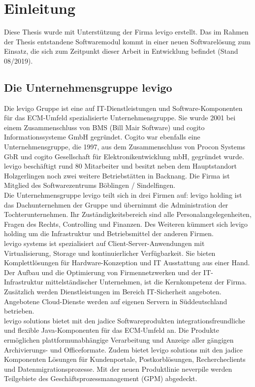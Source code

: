 \chapter{Einleitung}

Diese Thesis wurde mit Unterstützung der Firma levigo erstellt. Das im Rahmen der Thesis entstandene Softwaremodul kommt in einer neuen Softwarelösung zum Einsatz, die sich zum Zeitpunkt dieser Arbeit in Entwicklung befindet (Stand 08/2019).

\section{Die Unternehmensgruppe levigo}
Die levigo Gruppe ist eine auf \acs{IT}-Dienstleistungen und Software-Komponenten für das \acs{ECM}-Umfeld spezialisierte Unternehmensgruppe. Sie wurde 2001 bei einem Zusammenschluss von BMS (Bill Mair Software) und cogito Informationssysteme GmbH gegründet. Cogito war ebenfalls eine Unternehmensgruppe, die 1997, aus dem Zusammenschluss von Procon Systems GbR und cogito Gesellschaft für Elektronikentwicklung mbH, gegründet wurde.\\
levigo beschäftigt rund 80 Mitarbeiter und besitzt neben dem Hauptstandort Holzgerlingen noch zwei weitere Betriebstätten in Backnang. Die Firma ist Mitglied des Softwarezentrums Böblingen / Sindelfingen.\\
Die Unternehmensgruppe levigo teilt sich in drei Firmen auf: levigo holding ist das Dachunternehmen der Gruppe und übernimmt die Administration der Tochterunternehmen. Ihr Zuständigkeitsbereich sind alle Personalangelegenheiten, Fragen des Rechts, Controlling und Finanzen. Des Weiteren kümmert sich levigo holding um die Infrastruktur und Betriebsmittel der anderen Firmen.\\
levigo systems ist spezialisiert auf Client-Server-Anwendungen mit Virtualisierung, Storage und kontinuierlicher Verfügbarkeit. Sie bieten Komplettlösungen für Hardware-Konzeption und \acs{IT} Ausstattung aus einer Hand. Der Aufbau und die Optimierung von Firmennetzwerken und der \acs{IT}-Infrastruktur mittelständischer Unternehmen, ist die Kernkompetenz der Firma. Zusätzlich werden Dienstleistungen im Bereich \acs{IT}-Sicherheit angeboten. Angebotene Cloud-Dienste werden auf eigenen Servern in Süddeutschland betrieben.\\
levigo solutions bietet mit den jadice Softwareprodukten integrationsfreundliche und flexible Java-Komponenten für das \acs{ECM}-Umfeld an. Die Produkte ermöglichen plattformunabhängige Verarbeitung und Anzeige aller gängigen Archivierungs- und Officeformate. Zudem bietet levigo solutions mit den jadice Komponenten Lösungen für Kundenportale, Postkorblösungen, Rechercheclients und Datenmigrationsprozesse. Mit der neuen Produktlinie neverpile werden Teilgebiete des Geschäftsprozessmanagement (\acs{GPM}) abgedeckt.\cite{1}

